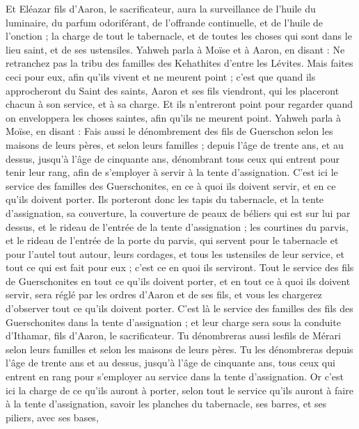\begin{multicols}{2}
Et Eléazar fils d'Aaron, le sacrificateur, aura la surveillance de l'huile du luminaire, du parfum odoriférant, de l'offrande continuelle, et de l'huile de l'onction ; la charge de tout le tabernacle, et de toutes les choses qui sont dans le lieu saint, et de ses ustensiles.
Yahweh parla à Moïse et à Aaron, en disant :
Ne retranchez pas la tribu des familles des Kehathites d'entre les Lévites.
Mais faites ceci pour eux, afin qu'ils vivent et ne meurent point ; c'est que quand ils approcheront du Saint des saints, Aaron et ses fils viendront, qui les placeront chacun à son service, et à sa charge.
Et ils n'entreront point pour regarder quand on enveloppera les choses saintes, afin qu'ils ne meurent point.
Yahweh parla à Moïse, en disant :
Fais aussi le dénombrement des fils de Guerschon selon les maisons de leurs pères, et selon leurs familles ;
depuis l'âge de trente ans, et au dessus, jusqu'à l'âge de cinquante ans, dénombrant tous ceux qui entrent pour tenir leur rang, afin de s'employer à servir à la tente d'assignation.
C'est ici le service des familles des Guerschonites, en ce à quoi ils doivent servir, et en ce qu'ils doivent porter.
Ils porteront donc les tapis du tabernacle, et la tente d'assignation, sa couverture, la couverture de peaux de béliers qui est sur lui par dessus, et le rideau de l'entrée de la tente d'assignation ;
les courtines du parvis, et le rideau de l'entrée de la porte du parvis, qui servent pour le tabernacle et pour l'autel tout autour, leurs cordages, et tous les ustensiles de leur service, et tout ce qui est fait pour eux ; c'est ce en quoi ils serviront.
Tout le service des fils de Guerschonites en tout ce qu'ils doivent porter, et en tout ce à quoi ils doivent servir, sera réglé par les ordres d'Aaron et de ses fils, et vous les chargerez d'observer tout ce qu'ils doivent porter.
C'est là le service des familles des fils des Guerschonites dans la tente d'assignation ; et leur charge sera sous la conduite d'Ithamar, fils d'Aaron, le sacrificateur.
Tu dénombreras aussi lesfils de Mérari selon leurs familles et selon les maisons de leurs pères.
Tu les dénombreras depuis l'âge de trente ans et au dessus, jusqu'à l'âge de cinquante ans, tous ceux qui entrent en rang pour s'employer au service dans la tente d'assignation.
Or c'est ici la charge de ce qu'ils auront à porter, selon tout le service qu'ils auront à faire à la tente d'assignation, savoir les planches du tabernacle, ses barres, et ses piliers, avec ses bases,

\end{multicols}
